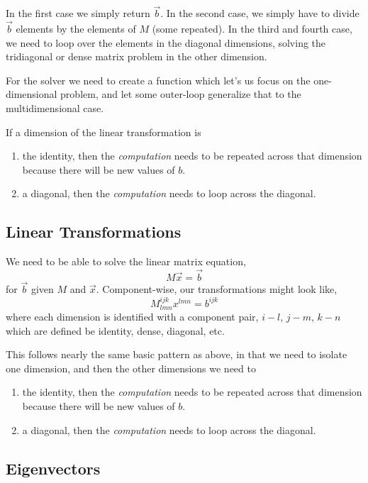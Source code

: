 \documentclass[11pt]{article}
\begin{document}
In the first case we simply return $\vec{b}$. In the second case, we simply have to divide $\vec{b}$ elements by the elements of $M$ (some repeated). In the third and fourth case, we need to loop over the elements in the diagonal dimensions, solving the tridiagonal or dense matrix problem in the other dimension.

For the solver we need to create a function which let's us focus on the one-dimensional problem, and let some outer-loop generalize that to the multidimensional case.

If a dimension of the linear transformation is
\begin{enumerate}
\item the identity, then the \emph{computation} needs to be repeated across that dimension because there will be new values of $b$.
\item a diagonal, then the \emph{computation} needs to loop across the diagonal.
\end{enumerate}

\subsection{Linear Transformations}

We need to be able to solve the linear matrix equation,
\begin{equation}
M \vec{x} = \vec{b}
\end{equation}
for $\vec{b}$ given $M$ and $\vec{x}$. Component-wise, our transformations might look like,
\begin{equation}
M^{ijk}_{lmn} x^{lmn} = b^{ijk}
\end{equation}
where each dimension is identified with a component pair, $i-l$, $j-m$, $k-n$ which are defined be identity, dense, diagonal, etc.

This follows nearly the same basic pattern as above, in that we need to isolate one dimension, and then the other dimensions we need to 
\begin{enumerate}
\item the identity, then the \emph{computation} needs to be repeated across that dimension because there will be new values of $b$.
\item a diagonal, then the \emph{computation} needs to loop across the diagonal.
\end{enumerate}

\subsection{Eigenvectors}
\end{document}
